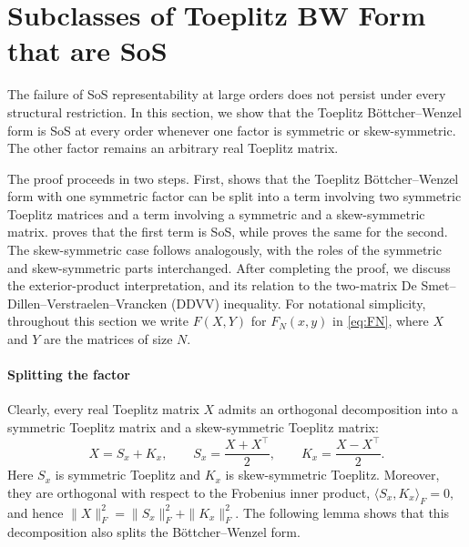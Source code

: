 \section{Subclasses of Toeplitz BW Form that are SoS}
\label{sec:positive-subclasses}

The failure of SoS representability at large orders does not persist
under every structural restriction.  In this section, we show that 
the Toeplitz B\"ottcher--Wenzel form is SoS at every order whenever
one factor is symmetric or skew-symmetric. 
The other factor remains an arbitrary real Toeplitz matrix.


The proof proceeds in two steps.  First,  shows
that the Toeplitz B\"ottcher--Wenzel form with one symmetric factor can
be split into a term involving two symmetric Toeplitz matrices and a
term involving a symmetric and a skew-symmetric matrix.
 proves that the first term is SoS, while
 proves the same for the second.  The
skew-symmetric case follows analogously, with the roles of the symmetric
and skew-symmetric parts interchanged. 
After completing the proof, we discuss the exterior-product
interpretation, and its relation to the two-matrix De Smet--Dillen--Verstraelen--Vrancken (DDVV) inequality. 
For notational simplicity, throughout this section we write $F(X,Y)$
for $F_N(x,y)$ in \eqref{eq:FN}, where $X$ and $Y$ are the 
matrices of size $N$.  



\paragraph{Splitting the factor}
\label{subsec:positive-split}
Clearly, every real Toeplitz matrix $X$ admits an orthogonal
decomposition into a symmetric Toeplitz matrix and a skew-symmetric
Toeplitz matrix:
\begin{equation}\label{eq:positive-split}
 X=S_x+K_x,
 \qquad
 S_x=\frac{X+X^\top}{2},
 \qquad
 K_x=\frac{X-X^\top}{2}.
\end{equation}
Here $S_x$ is symmetric Toeplitz and $K_x$ is skew-symmetric Toeplitz.
Moreover, they are orthogonal with respect to the Frobenius inner
product,
$
 \langle S_x,K_x\rangle_F=0,
$
and hence
$
\|X\|_F^2=\|S_x\|_F^2+\|K_x\|_F^2.
$
The following lemma shows that this decomposition also splits the
B\"ottcher--Wenzel form.

